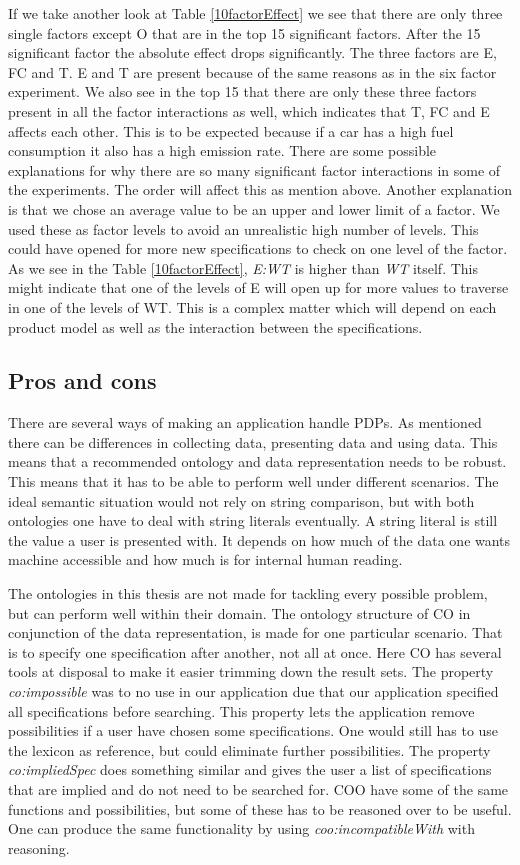 \documentclass{llncs}
\begin{document}
If we take another look at Table \ref{10factorEffect} we see that
there are only three single factors except O that are in the top 15
significant factors.  After the 15 significant factor the absolute
effect drops significantly. The three factors are E, FC and T. E and T
are present because of the same reasons as in the six factor
experiment. We also see in the top 15 that there are only these three
factors present in all the factor interactions as well, which
indicates that T, FC and E affects each other. This is to be expected
because if a car has a high fuel consumption it also has a high
emission rate. There are some possible explanations for why there are
so many significant factor interactions in some of the
experiments. The order will affect this as mention above. Another
explanation is that we chose an average value to be an upper and lower
limit of a factor. We used these as factor levels to avoid an
unrealistic high number of levels. This could have opened for more new
specifications to check on one level of the factor.  As we see in the
Table \ref{10factorEffect}, \emph{E:WT} is higher than \emph{WT}
itself. This might indicate that one of the levels of E will open up
for more values to traverse in one of the levels of WT. This is a
complex matter which will depend on each product model as well as the
interaction between the specifications.

\subsection{Pros and cons}
There are several ways of making an application handle PDPs. As
mentioned there can be differences in collecting data, presenting data
and using data. This means that a recommended ontology and data
representation needs to be robust. This means that it has to be able
to perform well under different scenarios.  The ideal semantic
situation would not rely on string comparison, but with both
ontologies one have to deal with string literals eventually. A string
literal is still the value a user is presented with.  It depends on
how much of the data one wants machine accessible and how much is for
internal human reading.

The ontologies in this thesis are not made for tackling every possible
problem, but can perform well within their domain. The ontology
structure of CO in conjunction of the data representation, is made for
one particular scenario. That is to specify one specification after
another, not all at once. Here CO has several tools at disposal to
make it easier trimming down the result sets. The property
\emph{co:impossible} was to no use in our application due that our
application specified all specifications before searching. This
property lets the application remove possibilities if a user have
chosen some specifications. One would still has to use the lexicon as
reference, but could eliminate further possibilities. The property
\emph{co:impliedSpec} does something similar and gives the user a
list of specifications that are implied and do not need to be searched
for.  COO have some of the same functions and possibilities, but some
of these has to be reasoned over to be useful. One can produce the
same functionality by using \emph{coo:incompatibleWith} with
reasoning.
\end{document}

